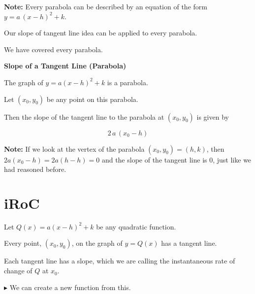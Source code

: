 \documentclass{ximera}
\begin{document}
\textbf{Note:} Every parabola can be described by an equation of the form $y = a \, (x - h)^2 + k$. 

Our slope of tangent line idea can be applied to every parabola. 

We have covered every parabola. 














\begin{theorem} \textbf{\textcolor{-red!75!green}{Slope of a Tangent Line (Parabola)}} 


The graph of $y = a (x - h)^2 + k$ is a parabola.

Let $(x_0, y_0)$ be any point on this parabola.

Then the slope of the tangent line to the parabola at $(x_0, y_0)$ is given by 



\[ 2 \, a \, (x_0 - h) \]


\end{theorem}












\textbf{Note:} If we look at the vertex of the parabola $(x_0, y_0) = (h, k)$, then $2 a (x_0 - h) = 2 a (h - h) = 0$ and the slope of the tangent line is $0$, just like we had reasoned before. 











\section*{iRoC}

Let $Q(x) = a (x - h)^2 + k$ be any quadratic function.

Every point, $(x_0, y_0)$, on the graph of $y = Q(x)$ has a tangent line.

Each tangent line has a slope, which we are calling the instantaneous rate of change of $Q$ at $x_0$.


\textbf{\textcolor{red!70!darkgray}{$\blacktriangleright$}} We can create a new function from this.
\end{document}
